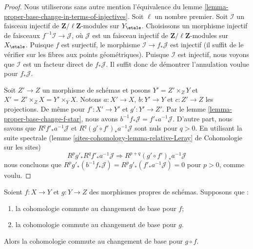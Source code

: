 \begin{proof}
Nous utiliserons sans autre mention l'équivalence du
lemme \ref{lemma-proper-base-change-in-terms-of-injectives}.
Soit $\ell$ un nombre premier.
Soit $\mathcal{I}$ un faisceau injectif de
$\mathbf{Z}/\ell\mathbf{Z}$-modules sur $Y_\etale$.
Choisissons un morphisme injectif de faisceaux $f^{-1}\mathcal{I} \to \mathcal{J}$,
où $\mathcal{J}$ est un faisceau injectif de
$\mathbf{Z}/\ell\mathbf{Z}$-modules sur $X_\etale$.
Puisque $f$ est surjectif, le morphisme $\mathcal{I} \to f_*\mathcal{J}$
est injectif (il suffit de le vérifier sur les fibres aux points géométriques).
Puisque $\mathcal{I}$ est injectif, nous voyons que $\mathcal{I}$
est un facteur direct de $f_*\mathcal{J}$. Il suffit donc
de démontrer l'annulation voulue pour $f_*\mathcal{J}$.

\medskip\noindent
Soit $Z' \to Z$ un morphisme de schémas et posons
$Y' = Z' \times_Z Y$ et $X' = Z' \times_Z X = Y' \times_ Y X$.
Notons $a : X' \to X$, $b : Y' \to Y$ et $c : Z' \to Z$ les
projections. De même pour $f' : X' \to Y'$ et $g' : Y' \to Z'$.
Par le lemme \ref{lemma-proper-base-change-f-star}, nous avons
$b^{-1}f_*\mathcal{J} = f'_*a^{-1}\mathcal{J}$.
D'autre part, nous savons que $R^qf'_*a^{-1}\mathcal{J}$ et
$R^q(g' \circ f')_*a^{-1}\mathcal{J}$ sont nuls pour $q > 0$.
En utilisant la suite spectrale
(lemme \ref{sites-cohomology-lemma-relative-Leray} de Cohomologie sur les sites)
$$
R^pg'_* R^qf'_* a^{-1}\mathcal{J} \Rightarrow
R^{p + q}(g' \circ f')_* a^{-1}\mathcal{J}
$$
nous concluons que
$ R^pg'_*(b^{-1}f_*\mathcal{J}) = R^pg'_*(f'_*a^{-1}\mathcal{J}) = 0$
pour $p > 0$, comme voulu.
\end{proof}

\begin{lemma}
\label{lemma-composition}
Soient $f : X \to Y$ et $g : Y \to Z$ des morphismes propres de schémas. Supposons que :
\begin{enumerate}
\item la cohomologie commute au changement de base pour $f$;
\item la cohomologie commute au changement de base pour $g$.
\end{enumerate}
Alors la cohomologie commute au changement de base pour $g \circ f$.
\end{lemma}

